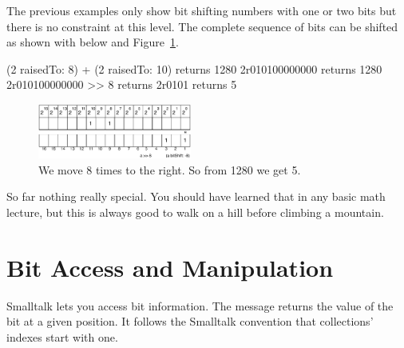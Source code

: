 \documentclass[a4paper,10pt,twoside]{book}
\begin{document}
The previous examples only show bit shifting numbers with one or two bits but there is no constraint at this level.
The complete sequence of bits can be shifted as shown with  below and Figure~\ref{16bits-1280shifted8}.

\begin{code}{}
(2 raisedTo: 8) + (2 raisedTo: 10) 
	returns 1280
2r010100000000
	returns 1280
2r010100000000 >> 8
	returns	2r0101
	returns 5
\end{code}



\begin{figure}[h]
\begin{center}
\includegraphics[width=0.45\textwidth]{16bits-1280shifted8}
\caption{We move 8 times to the right. So from 1280 we get 5.\label{16bits-1280shifted8}}
\end{center}
\end{figure}

So far nothing really special. You should have learned that in any basic math lecture, but this is always good 
to walk on a hill before climbing a mountain.  



\section{Bit Access and Manipulation}
Smalltalk lets you access bit information. The message  returns the value of the bit at a given position. It follows the Smalltalk convention that collections' indexes start with one. 
\end{document}
